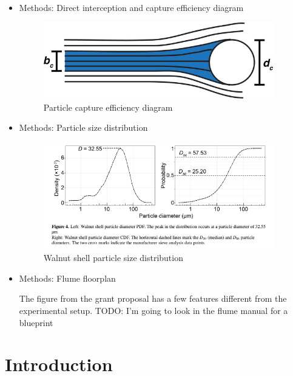 \documentclass[10pt,a4paper]{article}
\begin{document}
\begin{itemize}

\item Methods: Direct interception and capture efficiency diagram


\begin{figure}[h]
\includegraphics[width=10cm]{fauria particle capture efficiency diagram.jpg}
\centering
\caption{Particle capture efficiency diagram}
\end{figure}

\item Methods: Particle size distribution

\begin{figure}[h]
\includegraphics[width=10cm]{wf5-200sizedist.png}
\centering
\caption{Walnut shell particle size distribution}
\end{figure}

\item Methods: Flume floorplan

The figure from the grant proposal has a few features different from the experimental setup. TODO: I'm going to look in the flume manual for a blueprint

\end{itemize}



\section{Introduction}
\end{document}
